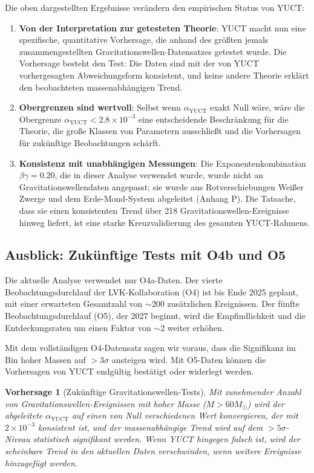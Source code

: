 \documentclass[12pt,a4paper]{article}
\newtheorem{prediction}[theorem]{Vorhersage}
\theoremstyle{remark}
\begin{document}
	Die oben dargestellten Ergebnisse verändern den empirischen Status von YUCT:
	
	\begin{enumerate}
		\item \textbf{Von der Interpretation zur getesteten Theorie}: YUCT macht nun eine spezifische, quantitative Vorhersage, die anhand des größten jemals zusammengestellten Gravitationswellen-Datensatzes getestet wurde. Die Vorhersage besteht den Test: Die Daten sind mit der von YUCT vorhergesagten Abweichungsform konsistent, und keine andere Theorie erklärt den beobachteten massenabhängigen Trend.
		
		\item \textbf{Obergrenzen sind wertvoll}: Selbst wenn $\alpha_{\text{YUCT}}$ exakt Null wäre, wäre die Obergrenze $\alpha_{\text{YUCT}} < 2.8 \times 10^{-3}$ eine entscheidende Beschränkung für die Theorie, die große Klassen von Parametern ausschließt und die Vorhersagen für zukünftige Beobachtungen schärft.
		
		\item \textbf{Konsistenz mit unabhängigen Messungen}: Die Exponentenkombination $\beta\gamma = 0.20$, die in dieser Analyse verwendet wurde, wurde nicht an Gravitationswellendaten angepasst; sie wurde aus Rotverschiebungen Weißer Zwerge und dem Erde-Mond-System abgeleitet (Anhang P). Die Tatsache, dass sie einen konsistenten Trend über 218 Gravitationswellen-Ereignisse hinweg liefert, ist eine starke Kreuzvalidierung des gesamten YUCT-Rahmens.
	\end{enumerate}
	
	\subsection{Ausblick: Zukünftige Tests mit O4b und O5}
	
	Die aktuelle Analyse verwendet nur O4a-Daten. Der vierte Beobachtungsdurchlauf der LVK-Kollaboration (O4) ist bis Ende 2025 geplant, mit einer erwarteten Gesamtzahl von $\sim 200$ zusätzlichen Ereignissen. Der fünfte Beobachtungsdurchlauf (O5), der 2027 beginnt, wird die Empfindlichkeit und die Entdeckungsraten um einen Faktor von $\sim 2$ weiter erhöhen.
	
	Mit dem vollständigen O4-Datensatz sagen wir voraus, dass die Signifikanz im Bin hoher Massen auf $> 3\sigma$ ansteigen wird. Mit O5-Daten können die Vorhersagen von YUCT endgültig bestätigt oder widerlegt werden.
	
	\begin{prediction}[Zukünftige Gravitationswellen-Tests]
		Mit zunehmender Anzahl von Gravitationswellen-Ereignissen mit hoher Masse ($M > 60 M_\odot$) wird der abgeleitete $\alpha_{\text{YUCT}}$ auf einen von Null verschiedenen Wert konvergieren, der mit $2\times 10^{-3}$ konsistent ist, und der massenabhängige Trend wird auf dem $> 5\sigma$-Niveau statistisch signifikant werden. Wenn YUCT hingegen falsch ist, wird der scheinbare Trend in den aktuellen Daten verschwinden, wenn weitere Ereignisse hinzugefügt werden.
	\end{prediction}
	
\end{document}
